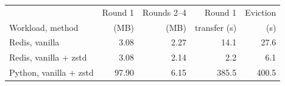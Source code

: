 \begin{tabular}{lrrrr}
\toprule
 & Round 1 & Rounds 2--4 & Round 1 & Eviction \\
Workload, method & (MB) & (MB) & transfer (s) & (s) \\
\midrule
Redis, vanilla & 3.08 & 2.27 & 14.1 & 27.6 \\
Redis, vanilla + zstd & 3.08 & 2.14 & 2.2 & 6.1 \\
Python, vanilla + zstd & 97.90 & 6.15 & 385.5 & 400.5 \\
\bottomrule
\end{tabular}

